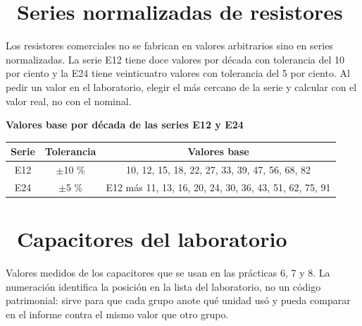 \documentclass[11pt,a4paper]{article}
\newcommand{\iconotexto}[2]{\textcolor{cyanNeon}{\faIcon{#1}}~#2}
\begin{document}
\section{\iconotexto{paperclip}{Series normalizadas de resistores}}

Los resistores comerciales no se fabrican en valores arbitrarios sino en series normalizadas. La serie E12 tiene doce valores por década con tolerancia del 10 por ciento y la E24 tiene veinticuatro valores con tolerancia del 5 por ciento. Al pedir un valor en el laboratorio, elegir el más cercano de la serie y calcular con el valor real, no con el nominal.

\begin{center}
\begin{minipage}{\linewidth}
\centering
{\small
\textbf{Valores base por década de las series E12 y E24}\par\smallskip
\begin{tabular}{@{}ccc@{}}
\toprule
Serie & Tolerancia & Valores base \\
\midrule
E12 & $\pm$10 \% & 10, 12, 15, 18, 22, 27, 33, 39, 47, 56, 68, 82 \\
E24 & $\pm$5 \% & E12 más 11, 13, 16, 20, 24, 30, 36, 43, 51, 62, 75, 91 \\
\bottomrule
\end{tabular}
}\par{}
\end{minipage}
\end{center}

\section{\iconotexto{paperclip}{Capacitores del laboratorio}}

Valores medidos de los capacitores que se usan en las prácticas 6, 7 y 8. La numeración identifica la posición en la lista del laboratorio, no un código patrimonial: sirve para que cada grupo anote qué unidad usó y pueda comparar en el informe contra el mismo valor que otro grupo.
\end{document}

